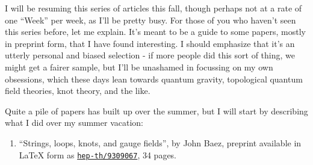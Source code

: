 \documentclass{article}
\def\tightlist{}
\begin{document}
I will be resuming this series of articles this fall, though perhaps not
at a rate of one ``Week'' per week, as I'll be pretty busy. For those of
you who haven't seen this series before, let me explain. It's meant to
be a guide to some papers, mostly in preprint form, that I have found
interesting. I should emphasize that it's an utterly personal and biased
selection - if more people did this sort of thing, we might get a fairer
sample, but I'll be unashamed in focussing on my own obsessions, which
these days lean towards quantum gravity, topological quantum field
theories, knot theory, and the like.

Quite a pile of papers has built up over the summer, but I will start by
describing what I did over my summer vacation:

\begin{enumerate}
\def\labelenumi{\arabic{enumi})}
\tightlist
\item
  ``Strings, loops, knots, and gauge fields'', by John Baez, preprint
  available in LaTeX form as
  \href{http://xxx.lanl.gov/abs/hep-th/9309067}{\texttt{hep-th/9309067}},
  34 pages.
\end{enumerate}
\end{document}
